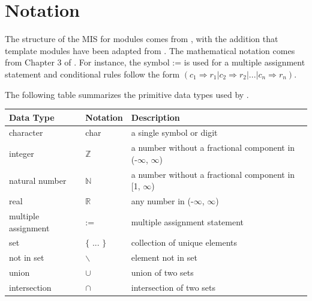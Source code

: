 \documentclass[12pt, titlepage]{article}
\begin{document}
\section{Notation}

The structure of the MIS for modules comes from \citet{HoffmanAndStrooper1995},
with the addition that template modules have been adapted from
\cite{GhezziEtAl2003}.  The mathematical notation comes from Chapter 3 of
\citet{HoffmanAndStrooper1995}.  For instance, the symbol := is used for a
multiple assignment statement and conditional rules follow the form $(c_1
  \Rightarrow r_1 | c_2 \Rightarrow r_2 | ... | c_n \Rightarrow r_n )$.

The following table summarizes the primitive data types used by \progname.

\begin{center}
  \renewcommand{\arraystretch}{1.2}
  \noindent
  \begin{tabular}{l l p{7.5cm}}
    \toprule
    \textbf{Data Type}  & \textbf{Notation} & \textbf{Description}                                             \\
    \midrule
    character           & char              & a single symbol or digit                                         \\
    integer             & $\mathbb{Z}$      & a number without a fractional component in (-$\infty$, $\infty$) \\
    natural number      & $\mathbb{N}$      & a number without a fractional component in [1, $\infty$)         \\
    real                & $\mathbb{R}$      & any number in (-$\infty$, $\infty$)                              \\
    multiple assignment & :=                & multiple assignment statement                                    \\
    set                 & $\{$ ... $\}$     & collection of unique elements                                    \\
    not in set          & $\backslash$      & element not in set                                               \\
    union               & $\cup$            & union of two sets                                                \\
    intersection        & $\cap$            & intersection of two sets                                         \\
    \bottomrule
  \end{tabular}
\end{center}
\end{document}
